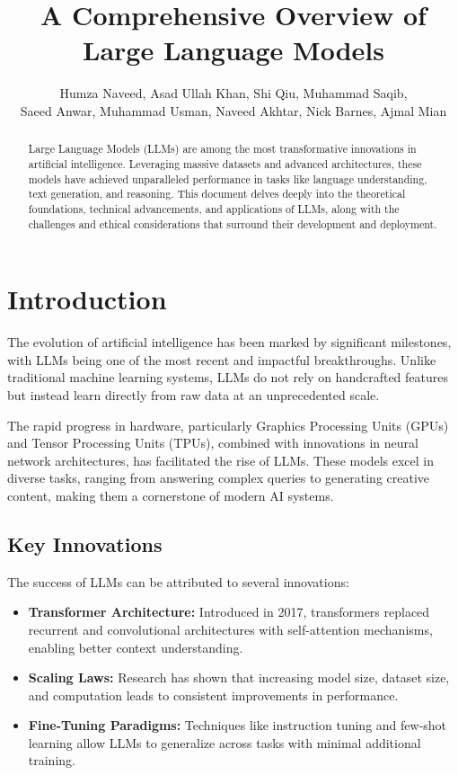 \documentclass[12pt]{article}
\title{A Comprehensive Overview of Large Language Models}
\author{Humza Naveed, Asad Ullah Khan, Shi Qiu, Muhammad Saqib, \\ Saeed Anwar, Muhammad Usman, Naveed Akhtar, Nick Barnes, Ajmal Mian}
\date{}
\begin{document}
\maketitle

\begin{abstract}
Large Language Models (LLMs) are among the most transformative innovations in artificial intelligence. Leveraging massive datasets and advanced architectures, these models have achieved unparalleled performance in tasks like language understanding, text generation, and reasoning. This document delves deeply into the theoretical foundations, technical advancements, and applications of LLMs, along with the challenges and ethical considerations that surround their development and deployment.
\end{abstract}

\section{Introduction}
The evolution of artificial intelligence has been marked by significant milestones, with LLMs being one of the most recent and impactful breakthroughs. Unlike traditional machine learning systems, LLMs do not rely on handcrafted features but instead learn directly from raw data at an unprecedented scale.

The rapid progress in hardware, particularly Graphics Processing Units (GPUs) and Tensor Processing Units (TPUs), combined with innovations in neural network architectures, has facilitated the rise of LLMs. These models excel in diverse tasks, ranging from answering complex queries to generating creative content, making them a cornerstone of modern AI systems.

\subsection{Key Innovations}
The success of LLMs can be attributed to several innovations:
\begin{itemize}
    \item \textbf{Transformer Architecture:} Introduced in 2017, transformers replaced recurrent and convolutional architectures with self-attention mechanisms, enabling better context understanding.
    \item \textbf{Scaling Laws:} Research has shown that increasing model size, dataset size, and computation leads to consistent improvements in performance.
    \item \textbf{Fine-Tuning Paradigms:} Techniques like instruction tuning and few-shot learning allow LLMs to generalize across tasks with minimal additional training.
\end{itemize}
\end{document}
